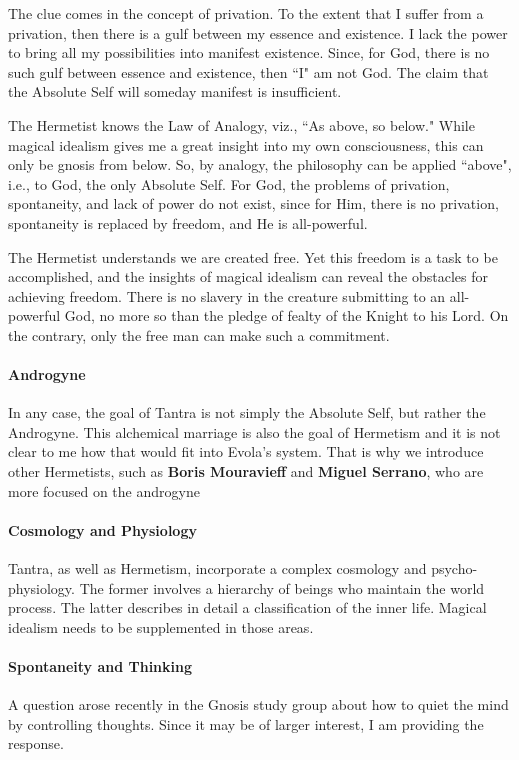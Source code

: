 The clue comes in the concept of privation. To the extent that I suffer from a privation, then there is a gulf between my essence and existence. I lack the power to bring all my possibilities into manifest existence. Since, for God, there is no such gulf between essence and existence, then ``I" am not God. The claim that the Absolute Self will someday manifest is insufficient.

The Hermetist knows the Law of Analogy, viz., ``As above, so below." While magical idealism gives me a great insight into my own consciousness, this can only be gnosis from below. So, by analogy, the philosophy can be applied ``above", i.e., to God, the only Absolute Self. For God, the problems of privation, spontaneity, and lack of power do not exist, since for Him, there is no privation, spontaneity is replaced by freedom, and He is all-powerful.

The Hermetist understands we are created free. Yet this freedom is a task to be accomplished, and the insights of magical idealism can reveal the obstacles for achieving freedom. There is no slavery in the creature submitting to an all-powerful God, no more so than the pledge of fealty of the Knight to his Lord. On the contrary, only the free man can make such a commitment.

\paragraph{Androgyne}
In any case, the goal of Tantra is not simply the Absolute Self, but rather the Androgyne. This alchemical marriage is also the goal of Hermetism and it is not clear to me how that would fit into Evola's system. That is why we introduce other Hermetists, such as \textbf{Boris Mouravieff} and \textbf{Miguel Serrano}, who are more focused on the androgyne

\paragraph{Cosmology and Physiology}
Tantra, as well as Hermetism, incorporate a complex cosmology and psycho-physiology. The former involves a hierarchy of beings who maintain the world process. The latter describes in detail a classification of the inner life. Magical idealism needs to be supplemented in those areas.

\paragraph{Spontaneity and Thinking}
A question arose recently in the Gnosis study group about how to quiet the mind by controlling thoughts. Since it may be of larger interest, I am providing the response.

